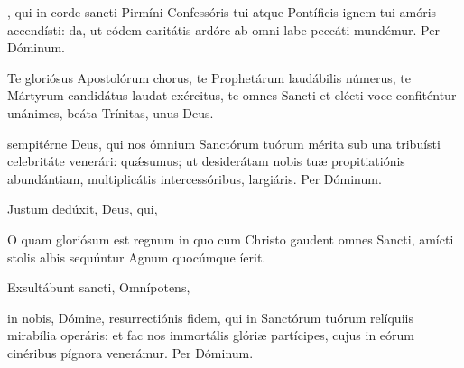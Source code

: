 \documentclass[fontsize=9pt,paper=A6,twoside,BCOR=1mm,DIV=22,headinclude]{scrarticle}
\begin{document}
\begin{multicols}{2}
{\Te 

}


\VRCPii 

\BCP 

, qui in corde sancti Pirmíni Confessóris tui atque Pontíficis ignem tui amóris accendísti: da, ut eódem caritátis ardóre ab omni labe peccáti mundémur. Per Dóminum.


\A Te gloriósus Apostolórum chorus, te Prophetárum laudábilis númerus, te Mártyrum candidátus laudat exércitus, te omnes Sancti et elécti voce confiténtur unánimes, beáta Trínitas, unus Deus.

\VRMmii 

 sempitérne Deus, qui nos ómnium Sanctórum tuórum mérita sub una tribuísti celebritáte venerári: quǽsumus; ut desiderátam nobis tuæ propitiatiónis abundántiam, multiplicátis intercessóribus, largiáris. Per Dóminum.


\AiiiCP 

\V Justum dedúxit,  Deus, qui, 


\A O quam gloriósum est regnum in quo cum Christo gaudent omnes Sancti, amícti stolis albis sequúntur Agnum quocúmque íerit.

\V Exsultábunt sancti,  Omnípotens, 





\VRMmi

\MiMm 

\columnbreak

 in nobis, Dómine, resurrectiónis fidem, qui in Sanctórum tuórum relíquiis mirabília operáris: et fac nos immortális glóriæ partícipes, cujus in eórum cinéribus pígnora venerámur. Per Dóminum.


\AiiiCP 


\end{multicols}
\end{document}
